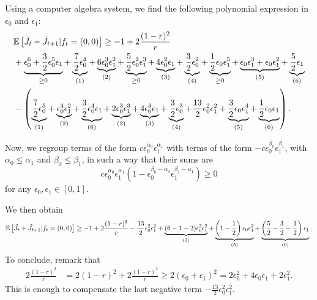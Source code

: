 \documentclass[11pt]{article}
\theoremstyle{plain}
\theoremstyle{definition}
\theoremstyle{remark}
\newcommand{\esp}[1]{\mathbb{E}\left[ #1 \right]}
\begin{document}
Using a computer algebra system, we find the following polynomial expression in $\epsilon_0$ and $\epsilon_1$:
\begin{align*}
& \esp{\Tilde{J}_{t}+\Tilde{J}_{t+1} | f_t=(0,0)} \geq -1 + 2 \frac{(1-r)^2}{r} \\
& + \underbrace{\epsilon_0^6 + \frac{3}{2} \epsilon_0^5 \epsilon_1}_{\geq 0} +\underbrace{\frac{7}{2} \epsilon_0^4}_{(1)} + \underbrace{6 \epsilon_0^3 \epsilon_1^2}_{(2)} + \underbrace{\frac{5}{2} \epsilon_0^2 \epsilon_1^3}_{\geq 0} + \underbrace{4 \epsilon_0^2 \epsilon_1}_{(3)} + \underbrace{\frac{3}{2} \epsilon_0^2}_{(4)} + \underbrace{\frac{1}{2} \epsilon_0 \epsilon_1^5}_{\geq 0} + \underbrace{\epsilon_0 \epsilon_1^3 + \epsilon_0 \epsilon_1^2}_{(5)} + \underbrace{\frac{5}{2} \epsilon_1}_{(6)} \\
& - \left(\underbrace{\frac{7}{2} \epsilon_0^5}_{(1)} + \underbrace{\epsilon_0^4 \epsilon_1^2}_{(2)} + \underbrace{\frac{3}{2}\epsilon_0^4 \epsilon_1}_{(6)} + \underbrace{2\epsilon_0^3 \epsilon_1^3}_{(2)} + \underbrace{4\epsilon_0^3 \epsilon_1}_{(3)} + \underbrace{\frac{3}{2} \epsilon_0^3}_{(4)} + \frac{13}{2} \epsilon_0^2 \epsilon_1^2 + \underbrace{\frac{3}{2} \epsilon_0 \epsilon_1^4}_{(5)} + \underbrace{\frac{1}{2} \epsilon_0 \epsilon_1}_{(6)} \right).
\end{align*}

Now, we regroup terms of the form $c \epsilon_0^{\alpha_0} \epsilon_1^{\alpha_1}$ with terms of the form $-c \epsilon_0^{\beta_0} \epsilon_1^{\beta_1}$, with $\alpha_0 \leq \alpha_1$ and $\beta_0 \leq \beta_1$, in such a way that their sums are
\begin{displaymath}
c \epsilon_0^{\alpha_0} \epsilon_1^{\alpha_1} (1 - \epsilon_0^{\beta_0 - \alpha_0} \epsilon_1^{\beta_1 - \alpha_1}) \geq 0
\end{displaymath}
for any $\epsilon_0, \epsilon_1 \in [0,1]$.

We then obtain
\begin{align*}
\esp{\Tilde{J}_{t}+\Tilde{J}_{t+1} | f_t=(0,0)} \geq -1 + 2 \frac{(1-r)^2}{r} - \frac{13}{2} \epsilon_0^2 \epsilon_1^2+ \underbrace{(6-1-2) \epsilon_0^3 \epsilon_1^2}_{(2)} + \underbrace{\left(1-\frac{1}{2}\right) \epsilon_0 \epsilon_1^2}_{(5)} + \underbrace{\left(\frac{5}{2}-\frac{3}{2}-\frac{1}{2}\right) \epsilon_1}_{(6)}.
\end{align*}
To conclude, remark that 
\begin{align*}
2 \frac{(1-r)^2}{r} & = 2 (1-r)^2 + 2 \frac{(1-r)^3}{r} \geq 2 (\epsilon_0 + \epsilon_1)^2 = 2 \epsilon_0^2 + 4 \epsilon_0 \epsilon_1 + 2 \epsilon_1^2.
\end{align*}
This is enough to compensate the last negative term $\displaystyle -\frac{13}{2} \epsilon_0^2 \epsilon_1^2$.
\end{document}
